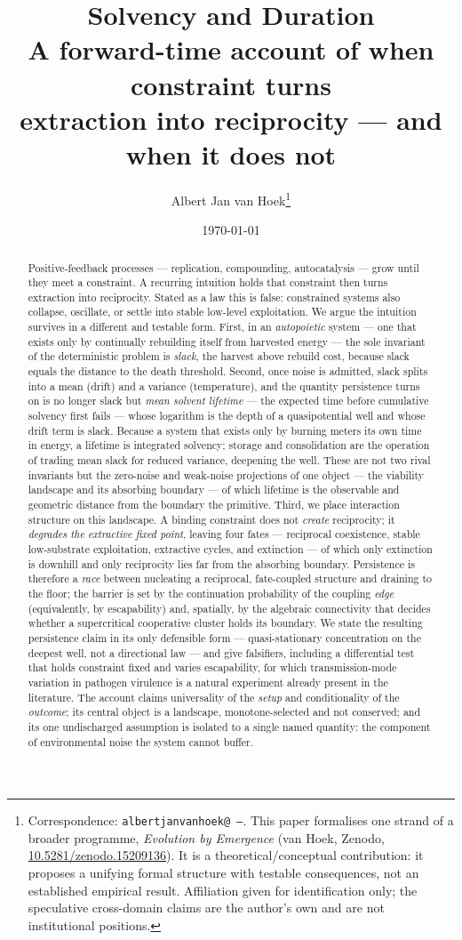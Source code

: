 \documentclass[11pt]{article}
\title{\textbf{Solvency and Duration}\\[4pt]
\large A forward-time account of when constraint turns\\ extraction into reciprocity --- and when it does not}
\author{Albert Jan van Hoek\thanks{Correspondence: \texttt{albertjanvanhoek@\,---}. This paper formalises one strand of a broader programme, \emph{Evolution by Emergence} (van Hoek, Zenodo, \href{https://doi.org/10.5281/zenodo.15209136}{10.5281/zenodo.15209136}). It is a theoretical/conceptual contribution: it proposes a unifying formal structure with testable consequences, not an established empirical result. Affiliation given for identification only; the speculative cross-domain claims are the author's own and are not institutional positions.}}
\date{\today}
\theoremstyle{plain}
\theoremstyle{definition}
\begin{document}
\maketitle

\begin{abstract}
\noindent Positive-feedback processes --- replication, compounding, autocatalysis --- grow until they meet a constraint. A recurring intuition holds that constraint then turns extraction into reciprocity. Stated as a law this is false: constrained systems also collapse, oscillate, or settle into stable low-level exploitation. We argue the intuition survives in a different and testable form. First, in an \emph{autopoietic} system --- one that exists only by continually rebuilding itself from harvested energy --- the sole invariant of the deterministic problem is \emph{slack}, the harvest above rebuild cost, because slack equals the distance to the death threshold. Second, once noise is admitted, slack splits into a mean (drift) and a variance (temperature), and the quantity persistence turns on is no longer slack but \emph{mean solvent lifetime} --- the expected time before cumulative solvency first fails --- whose logarithm is the depth of a quasipotential well and whose drift term is slack. Because a system that exists only by burning meters its own time in energy, a lifetime is integrated solvency; storage and consolidation are the operation of trading mean slack for reduced variance, deepening the well. These are not two rival invariants but the zero-noise and weak-noise projections of one object --- the viability landscape and its absorbing boundary --- of which lifetime is the observable and geometric distance from the boundary the primitive. Third, we place interaction structure on this landscape. A binding constraint does not \emph{create} reciprocity; it \emph{degrades the extractive fixed point}, leaving four fates --- reciprocal coexistence, stable low-substrate exploitation, extractive cycles, and extinction --- of which only extinction is downhill and only reciprocity lies far from the absorbing boundary. Persistence is therefore a \emph{race} between nucleating a reciprocal, fate-coupled structure and draining to the floor; the barrier is set by the continuation probability of the coupling \emph{edge} (equivalently, by escapability) and, spatially, by the algebraic connectivity that decides whether a supercritical cooperative cluster holds its boundary. We state the resulting persistence claim in its only defensible form --- quasi-stationary concentration on the deepest well, not a directional law --- and give falsifiers, including a differential test that holds constraint fixed and varies escapability, for which transmission-mode variation in pathogen virulence is a natural experiment already present in the literature. The account claims universality of the \emph{setup} and conditionality of the \emph{outcome}; its central object is a landscape, monotone-selected and not conserved; and its one undischarged assumption is isolated to a single named quantity: the component of environmental noise the system cannot buffer.
\end{abstract}
\end{document}
